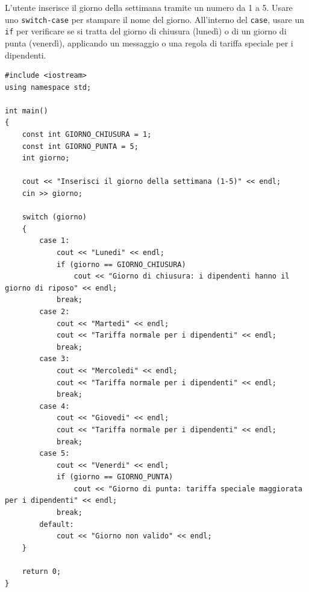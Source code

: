 \documentclass[11pt,fleqn]{book}
\begin{document}
\begin{esercizio}[2]
    L'utente inserisce il giorno della settimana tramite un numero da 1 a 5. Usare uno \texttt{switch-case} per stampare il nome del giorno. All'interno del \texttt{case}, usare un \texttt{if} per verificare se si tratta del giorno di chiusura (lunedì) o di un giorno di punta (venerdì), applicando un messaggio o una regola di tariffa speciale per i dipendenti.
    \ifsoluzioni
    \solution
    \begin{lstlisting}[style=cpp]
#include <iostream>
using namespace std;

int main()
{
    const int GIORNO_CHIUSURA = 1;
    const int GIORNO_PUNTA = 5;
    int giorno;

    cout << "Inserisci il giorno della settimana (1-5)" << endl;
    cin >> giorno;

    switch (giorno)
    {
        case 1:
            cout << "Lunedi" << endl;
            if (giorno == GIORNO_CHIUSURA)
                cout << "Giorno di chiusura: i dipendenti hanno il giorno di riposo" << endl;
            break;
        case 2:
            cout << "Martedi" << endl;
            cout << "Tariffa normale per i dipendenti" << endl;
            break;
        case 3:
            cout << "Mercoledi" << endl;
            cout << "Tariffa normale per i dipendenti" << endl;
            break;
        case 4:
            cout << "Giovedi" << endl;
            cout << "Tariffa normale per i dipendenti" << endl;
            break;
        case 5:
            cout << "Venerdi" << endl;
            if (giorno == GIORNO_PUNTA)
                cout << "Giorno di punta: tariffa speciale maggiorata per i dipendenti" << endl;
            break;
        default:
            cout << "Giorno non valido" << endl;
    }

    return 0;
}
    \end{lstlisting}
    \fi
\end{esercizio}
\end{document}
